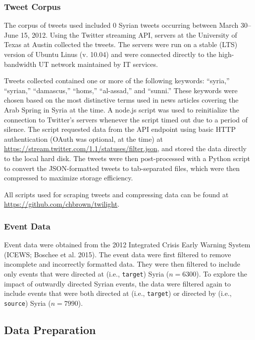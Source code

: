 \documentclass[
  english,
  man]{apa6}
\begin{document}
\hypertarget{tweet-corpus}{%
\subsubsection{Tweet Corpus}\label{tweet-corpus}}

The corpus of tweets used included 0 Syrian tweets
occurring between March 30--June 15, 2012. Using the Twitter streaming API,
servers at the University of Texas at Austin collected the tweets. The servers
were run on a stable (LTS) version of Ubuntu Linus (v. 10.04) and were connected
directly to the high-bandwidth UT network maintained by IT services.

Tweets collected contained one or more of the following keywords: \enquote{syria,}
\enquote{syrian,} \enquote{damascus,} \enquote{homs,} \enquote{al-assad,} and \enquote{sunni.} These keywords were
chosen based on the most distinctive terms used in news articles covering the
Arab Spring in Syria at the time. A node.js script was used to reinitialize the
connection to Twitter's servers whenever the script timed out due to a period of
silence. The script requested data from the API endpoint using basic HTTP
authentication (OAuth was optional, at the time) at
\url{https://stream.twitter.com/1.1/statuses/filter.json}, and stored the data
directly to the local hard disk. The tweets were then post-processed with a
Python script to convert the JSON-formatted tweets to tab-separated files, which
were then compressed to maximize storage efficiency.

All scripts used for scraping tweets and compressing data can be found at
\url{https://github.com/chbrown/twilight}.

\hypertarget{event-data}{%
\subsubsection{Event Data}\label{event-data}}

Event data were obtained from the 2012 Integrated Crisis Early Warning System
(ICEWS; Boschee et al. 2015). The event data were first filtered to remove
incomplete and incorrectly formatted data. They were then filtered to include
only events that were directed at (i.e., \texttt{target}) Syria (\(n = 6300\)). To
explore the impact of outwardly directed Syrian events, the data were filtered
again to include events that were both directed at (i.e., \texttt{target}) or directed
by (i.e., \texttt{source}) Syria (\(n = 7990\)).

\hypertarget{data-preparation}{%
\subsection{Data Preparation}\label{data-preparation}}
\end{document}
